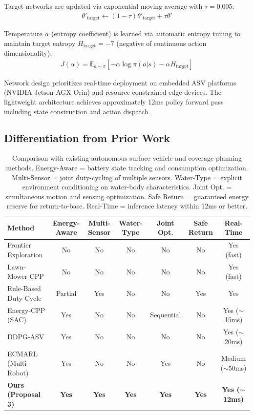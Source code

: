 Target networks are updated via exponential moving average with $\tau = 0.005$:
\begin{align}
\theta'_{\text{target}} \leftarrow (1 - \tau) \theta'_{\text{target}} + \tau \theta'
\end{align}

Temperature $\alpha$ (entropy coefficient) is learned via automatic entropy tuning to maintain target entropy $H_{\text{target}} = -7$ (negative of continuous action dimensionality):
\begin{align}
J(\alpha) = \mathbb{E}_{a \sim \pi}[-\alpha \log \pi(a|s) - \alpha H_{\text{target}}]
\end{align}

Network design prioritizes real-time deployment on embedded ASV platforms (NVIDIA Jetson AGX Orin) and resource-constrained edge devices. The lightweight architecture achieves approximately 12ms policy forward pass including state construction and action dispatch.

\subsection{Differentiation from Prior Work}

\begin{table}[t]
\centering
\small
\begin{tabular}{lcccccc}
\hline
Method & Energy-Aware & Multi-Sensor & Water-Type & Joint Opt. & Safe Return & Real-Time \\
\hline
Frontier Exploration & No & No & No & No & No & Yes (fast) \\
Lawn-Mower CPP & No & No & No & No & No & Yes (fast) \\
Rule-Based Duty-Cycle & Partial & Yes & No & No & Yes & Yes \\
Energy-CPP (SAC) & Yes & No & No & Sequential & No & Yes ($\sim$15ms) \\
DDPG-ASV & Yes & No & No & No & No & Yes ($\sim$20ms) \\
ECMARL (Multi-Robot) & Yes & No & No & Yes & No & Medium ($\sim$50ms) \\
\textbf{Ours (Proposal 3)} & \textbf{Yes} & \textbf{Yes} & \textbf{Yes} & \textbf{Yes} & \textbf{Yes} & \textbf{Yes ($\sim$12ms)} \\
\hline
\end{tabular}
\vspace{0.3cm}
\caption{Comparison with existing autonomous surface vehicle and coverage planning methods. Energy-Aware = battery state tracking and consumption optimization. Multi-Sensor = joint duty-cycling of multiple sensors. Water-Type = explicit environment conditioning on water-body characteristics. Joint Opt. = simultaneous motion and sensing optimization. Safe Return = guaranteed energy reserve for return-to-base. Real-Time = inference latency within 12ms or better.}
\label{tab:comparison}
\end{table}

